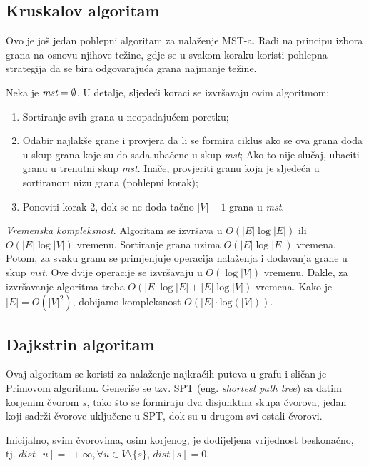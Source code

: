 \documentclass[a4paper, utf8, 11pt, colorlinks]{book}
\begin{document}
\subsection{Kruskalov algoritam}

Ovo je još jedan pohlepni algoritam za nalaženje MST-a. Radi na principu izbora grana na osnovu njihove težine, gdje se u svakom koraku koristi pohlepna strategija da se bira odgovarajuća grana najmanje težine.

 Neka je $\emph{mst} = \emptyset$. U detalje, sljedeći koraci se izvršavaju ovim algoritmom:

\begin{enumerate}
	\item Sortiranje svih grana u neopadajućem poretku;
	\item Odabir najlakše grane i provjera da li se formira ciklus ako se ova 
	grana doda u skup grana koje su do sada ubačene u skup \emph{mst}; Ako to nije slučaj, ubaciti granu u trenutni skup \emph{mst}. Inače, provjeriti  granu koja je sljedeća u sortiranom nizu grana (pohlepni korak);
	\item Ponoviti korak 2, dok se ne doda tačno $|V|-1$ grana u \emph{mst}.
\end{enumerate} 

\noindent \emph{Vremenska kompleksnost}. Algoritam se izvršava u $O(|E|\log |E|)$ ili $O(|E|\log |V|)$ vremenu. Sortiranje grana uzima $O(|E| \log|E|)$ vremena. Potom, za svaku granu 
se primjenjuje operacija nalaženja i dodavanja grane u skup \emph{mst}. Ove dvije operacije se izvršavaju u $O(\log |V|)$ vremenu. Dakle, za izvršavanje algoritma treba $O(|E|\log |E| + |E|\log |V|)$ vremena. Kako je $|E|=O(|V|^2)$, dobijamo kompleksnost $O(|E| \cdot \mathrm{log}(|V|))$. 

\subsection{Dajkstrin algoritam}

Ovaj algoritam se koristi za nalaženje najkraćih puteva u grafu i sličan je Primovom algoritmu. Generiše se tzv. SPT (eng. \emph{shortest path tree}) sa datim korjenim čvorom $s$, tako  što se formiraju dva disjunktna skupa čvorova, jedan koji sadrži čvorove uključene u SPT, dok su u drugom svi ostali čvorovi. 

Inicijalno, svim čvorovima, osim korjenog, je dodijeljena vrijednost beskonačno, tj. $dist[u]=\ +\infty, \forall u \in V\setminus \{s\}$, $dist[s]=0$. 
\end{document}
